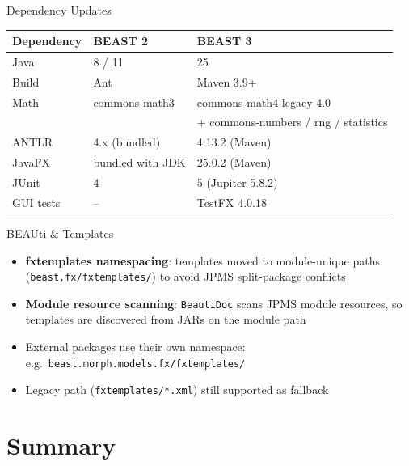 \documentclass[aspectratio=169,11pt]{beamer}
\newcommand{\code}[1]{\texttt{#1}}
\begin{document}
\begin{frame}{Dependency Updates}
\begin{center}
\begin{tabular}{lll}
\toprule
\textbf{Dependency} & \textbf{BEAST 2} & \textbf{BEAST 3} \\
\midrule
Java & 8 / 11 & 25 \\
Build & Ant & Maven 3.9+ \\
Math & commons-math3 & commons-math4-legacy 4.0 \\
 & & + commons-numbers / rng / statistics \\
ANTLR & 4.x (bundled) & 4.13.2 (Maven) \\
JavaFX & bundled with JDK & 25.0.2 (Maven) \\
JUnit & 4 & 5 (Jupiter 5.8.2) \\
GUI tests & -- & TestFX 4.0.18 \\
\bottomrule
\end{tabular}
\end{center}
\end{frame}

\begin{frame}{BEAUti \& Templates}
\begin{itemize}
\item \textbf{fxtemplates namespacing}: templates moved to module-unique paths (\code{beast.fx/fxtemplates/}) to avoid JPMS split-package conflicts
\item \textbf{Module resource scanning}: \code{BeautiDoc} scans JPMS module resources, so templates are discovered from JARs on the module path
\item External packages use their own namespace:\\
  e.g.\ \code{beast.morph.models.fx/fxtemplates/}
\item Legacy path (\code{fxtemplates/*.xml}) still supported as fallback
\end{itemize}
\end{frame}

\section{Summary}
\end{document}
